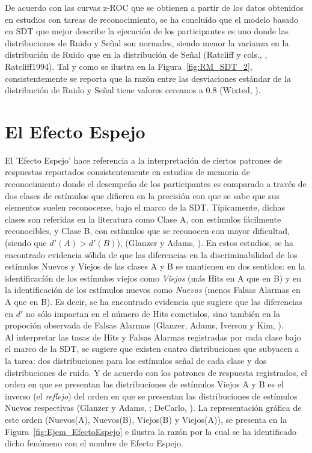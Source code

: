 De acuerdo con las curvas z-ROC que se obtienen a partir de los datos obtenidos en estudios con tareas de reconocimiento, se ha concluído que el modelo basado en SDT que mejor describe la ejecución de los participantes es uno donde las distribuciones de Ruido y Señal son normales, siendo menor la varianza en la distribución de Ruido que en la distribución de Señal (Ratcliff y cols., \citeyear{ Ratcliff1992}, {Ratcliff1994}). Tal y como se ilustra en la Figura~\ref{fig:RM_SDT_2}, consistentemente se reporta que la razón entre las desviaciones estándar de la distribución de Ruido y Señal tiene valores cercanos a 0.8 (Wixted, \citeyear{Wixted2007}).\\






\section{El Efecto Espejo}

El 'Efecto Espejo' hace referencia a la interpretación de ciertos patrones de respuestas reportados consistentemente en estudios de memoria de reconocimiento donde el desempeño de los participantes es comparado a través de dos clases de estímulos que difieren en la precisión con que se sabe que sus elementos suelen reconocerse, bajo el marco de la SDT. Típicamente, dichas clases son referidas en la literatura como Clase A, con estímulos fácilmente reconocibles, y Clase B, con estímulos que se reconocen con mayor dificultad, (siendo que $d'(A) > d'(B)$), (Glanzer y Adams, \citeyear{Glanzer1990}). En estos estudios, se ha encontrado evidencia sólida de que las diferencias en la discriminabilidad de los estímulos Nuevos y Viejos de las clases A y B se mantienen en dos sentidos: en la identificacíón de los estímulos viejos como \textit{Viejos} (más Hits en A que en B) y en la identificación de los estímulos nuevos como \textit{Nuevos} (menos Falsas Alarmas en A que en B). Es decir, se ha encontrado evidencia que sugiere que las diferencias en $d'$ no sólo impactan en el número de Hits cometidos, sino también en la propoción observada de Falsas Alarmas (Glanzer, Adams, Iverson y Kim, \citeyear{Glanzer1993}).\\

Al interpretar las tasas de Hits y Falsas Alarmas registradas por cada clase bajo el marco de la SDT, se sugiere que existen cuatro distribuciones que subyacen a la tarea: dos distribuciones para los estímulos señal de cada clase y dos distribuciones de ruido. Y de acuerdo con los patrones de respuesta registrados, el orden en que se presentan las distribuciones de estímulos Viejos A y B es el inverso (el \textit{reflejo}) del orden en que se presentan las distribuciones de estímulos Nuevos respectivas (Glanzer y Adams, \citeyear{Glanzer1990}; DeCarlo, \citeyear{DeCarlo2007}). La representación gráfica de este orden (Nuevos(A), Nuevos(B), Viejos(B) y Viejos(A)), se presenta en la Figura~\ref{fig:Ejem_EfectoEspejo} e ilustra la razón por la cual se ha identificado dicho fenómeno con el nombre de Efecto Espejo.\\

